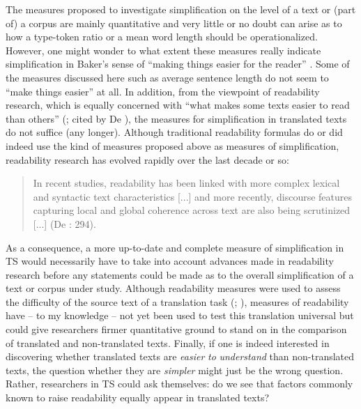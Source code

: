 The measures proposed to investigate simplification on the level of a text or (part of) a corpus are mainly quantitative and very little or no doubt can arise as to how a type-token ratio or a mean word length should be operationalized. However, one might wonder to what extent these measures really indicate simplification in Baker’s sense of “making things easier for the reader”  \citep[182]{Baker1996}. Some of the measures discussed here such as average sentence length do not seem to “make things easier”  \citep{Baker1996} at all. In addition, from the viewpoint of readability research, which is equally concerned with “what makes some texts easier to read than others” (\citealt{dubay_principles_2004}; cited by  De \citealt{ClercqEtAl2014}), the measures for simplification in translated texts do not suffice (any longer). Although traditional readability formulas do or did indeed use the kind of measures proposed above as measures of simplification, readability research has evolved rapidly over the last decade or so:


\begin{quote}
In recent studies, readability has been linked with more complex lexical and syntactic text characteristics [...] and more recently, discourse features capturing local and global coherence across text are also being scrutinized [...]  (De \citealt{ClercqEtAl2014}: 294).
\end{quote}


As a consequence, a more up-to-date and complete measure of simplification in TS would necessarily have to take into account advances made in readability research before any statements could be made as to the overall simplification of a text or corpus under study. Although readability measures were used to assess the difficulty of the source text of a translation task (\citealt{gopferich_indicators_2009}; \citealt{sun_measuring_2014}), measures of readability have – to my knowledge – not yet been used to test this translation universal but could give researchers firmer quantitative ground to stand on in the comparison of translated and non-translated texts. Finally, if one is indeed interested in discovering whether translated texts are \textit{easier} \textit{to} \textit{understand} than non-translated texts, the question whether they are \textit{simpler} might just be the wrong question. Rather, researchers in TS could ask themselves: do we see that factors commonly known to raise readability equally appear in translated texts?


